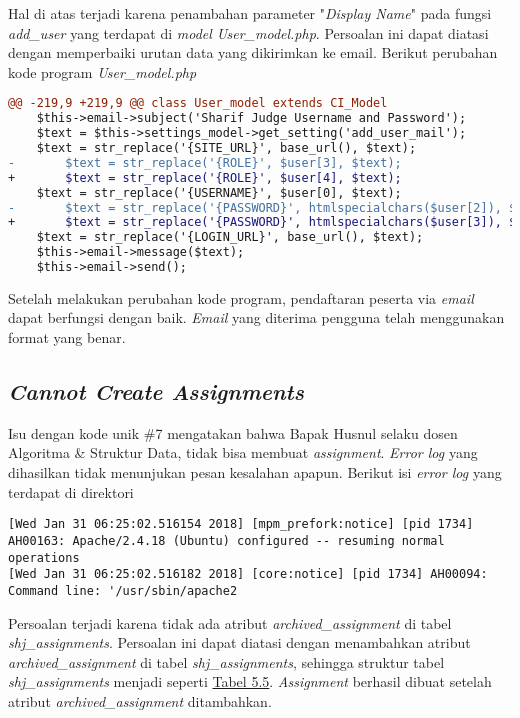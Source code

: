 	Hal di atas terjadi karena penambahan parameter "\textit{Display Name}" pada fungsi \textit{add\_user} yang terdapat di \textit{model User\_model.php}. Persoalan ini dapat diatasi dengan memperbaiki urutan data yang dikirimkan ke email. Berikut perubahan kode program
	\textit{User\_model.php}
\begin{lstlisting}[language=diff, basicstyle=\ttfamily, frame=single,
columns=fullflexible, keepspaces=true, breaklines=true]
@@ -219,9 +219,9 @@ class User_model extends CI_Model
	$this->email->subject('Sharif Judge Username and Password');
	$text = $this->settings_model->get_setting('add_user_mail');
	$text = str_replace('{SITE_URL}', base_url(), $text);
-   	$text = str_replace('{ROLE}', $user[3], $text);
+   	$text = str_replace('{ROLE}', $user[4], $text);
	$text = str_replace('{USERNAME}', $user[0], $text);
-   	$text = str_replace('{PASSWORD}', htmlspecialchars($user[2]), $text);
+   	$text = str_replace('{PASSWORD}', htmlspecialchars($user[3]), $text);
	$text = str_replace('{LOGIN_URL}', base_url(), $text);
	$this->email->message($text);
	$this->email->send();
\end{lstlisting}
	Setelah melakukan perubahan kode program, pendaftaran peserta via \textit{email} dapat berfungsi dengan baik. \textit{Email} yang diterima pengguna telah menggunakan format yang benar.
	
	\subsection{\textit{Cannot Create Assignments}}
	Isu dengan kode unik \#7 mengatakan bahwa Bapak Husnul selaku dosen Algoritma \& Struktur Data, tidak bisa membuat \textit{assignment}.\textit{ Error log} yang dihasilkan tidak menunjukan pesan kesalahan apapun. 
	Berikut isi \textit{error log} yang terdapat di direktori 
\begin{lstlisting}[basicstyle=\ttfamily, frame=single,columns=fullflexible, keepspaces=true, breaklines=true]
[Wed Jan 31 06:25:02.516154 2018] [mpm_prefork:notice] [pid 1734] AH00163: Apache/2.4.18 (Ubuntu) configured -- resuming normal operations
[Wed Jan 31 06:25:02.516182 2018] [core:notice] [pid 1734] AH00094: Command line: '/usr/sbin/apache2
\end{lstlisting}
	
	Persoalan terjadi karena tidak ada atribut \textit{archived\_assignment} di tabel \textit{shj\_assignments}. Persoalan ini dapat diatasi dengan menambahkan atribut \textit{archived\_assignment} di tabel \textit{shj\_assignments}, sehingga struktur tabel \textit{shj\_assignments} menjadi seperti \hyperref[tab:atributtabelassignments]{Tabel 5.5}. \textit{Assignment} berhasil dibuat setelah atribut \textit{archived\_assignment} ditambahkan.
	
